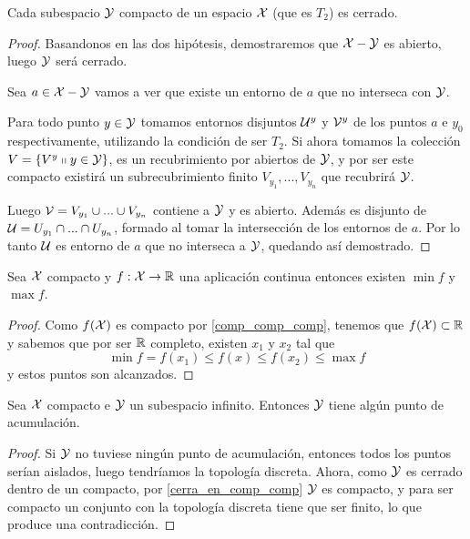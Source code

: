 \begin{prop}
	Cada subespacio $\mathcal{Y}$ compacto de un espacio $\mathcal{X}$ (que es $T_2$) es cerrado.
	\begin{proof}
		Basandonos en las dos hipótesis, demostraremos que $\mathcal{X} - \mathcal{Y}$ es abierto, luego $\mathcal{Y}$ será cerrado.
		
		Sea $a \in \mathcal{X}-\mathcal{Y}$ vamos a ver que existe un entorno de $a$ que no interseca con $\mathcal{Y}$.
		
		Para todo punto $y \in \mathcal{Y}$ tomamos entornos disjuntos $\mathcal{U}^y$ y $\mathcal{V}^y$ de los puntos $a$ e $y_0$ respectivamente, utilizando la condición de ser $T_2$. Si ahora tomamos la colección $V = \{V^y \shortparallel y \in \mathcal{Y}\}$, es un recubrimiento por abiertos de $\mathcal{Y}$, y por ser este compacto existirá un subrecubrimiento finito $V_{y_1}, ..., V_{y_n}$ que recubrirá $\mathcal{Y}$.
		
		Luego $\mathcal{V} = V_{y_1} \cup ... \cup V_{y_n}$ contiene a $\mathcal{Y}$ y es abierto. Además es disjunto de $\mathcal{U} = U_{y_1} \cap ... \cap U_{y_n}$, formado al tomar la intersección de los entornos de $a$. Por lo tanto $\mathcal{U}$ es entorno de $a$ que no interseca a $\mathcal{Y}$, quedando así demostrado.
	\end{proof}
\end{prop}


\begin{prop}
	Sea $\mathcal{X}$ compacto y $f:\mathcal{X} \rightarrow \mathbb{R}$ una aplicación continua entonces existen $\min f$ y $\max f$.
	\begin{proof}
		Como $f(\mathcal{X})$ es compacto por \ref{comp_comp_comp}, tenemos que $f(\mathcal{X}) \subset \mathbb{R}$ y sabemos que por ser $\mathbb{R}$ completo, existen $x_1$ y $x_2$ tal que
		\begin{equation}
			\min f = f(x_1) \leq f(x) \leq f(x_2) \leq \max f
		\end{equation}
		y estos puntos son alcanzados.
	\end{proof}
\end{prop}


\begin{prop}
		Sea $\mathcal{X}$ compacto e $\mathcal{Y}$ un subespacio infinito. Entonces $\mathcal{Y}$ tiene algún punto de acumulación.
	\begin{proof}
		Si $\mathcal{Y}$ no tuviese ningún punto de acumulación, entonces todos los puntos serían aislados, luego tendríamos la topología discreta. Ahora, como $\mathcal{Y}$ es cerrado dentro de un compacto, por \ref{cerra_en_comp_comp} $\mathcal{Y}$ es compacto, y para ser compacto un conjunto con la topología discreta tiene que ser finito, lo que produce una contradicción.
	\end{proof}
\end{prop}


